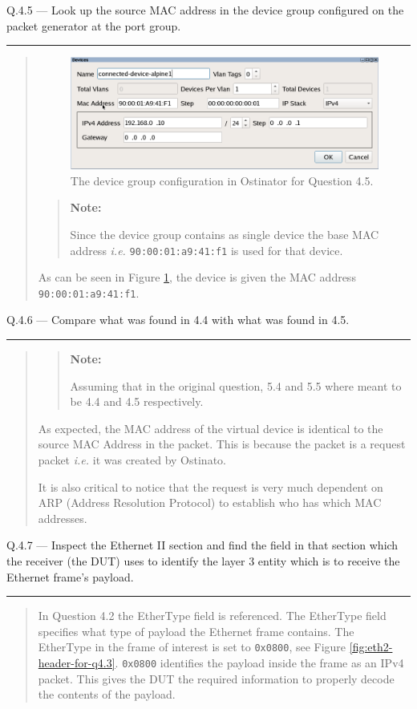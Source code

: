 \documentclass{article}
\newcommand\Que[2]{%
\begin{samepage}
\leavevmode\par
\noindent
Q.#1 --- #2\par\vspace{10pt}\hrule\vspace{10pt}
\end{samepage}}
\newenvironment{ans}
{\fbox{Answer}\begin{quote}\nopagebreak}
{\end{quote}}
\newcommand\ie{\emph{i.e.}}
\newenvironment{note}{%
\begin{quote}
\begin{tcolorbox}[colback=gray!10,arc=0mm,boxrule=0pt]
\raggedright
\textbf{Note:}%
}{%
\end{tcolorbox}
\end{quote}%
}
\begin{document}
\Que{4.5}{Look up the source MAC address in the device group
configured on the packet generator at the port group.}

\begin{ans}
\begin{figure}[H]
\centering
\includegraphics[width=14cm]{data/q4.5-device-group-config.png}
\caption{The device group configuration in Ostinator for
Question 4.5.}
\label{fig:devic-config-q4.5}
\end{figure}
\begin{note}
Since the device group contains as single device the
base MAC address \ie{} \texttt{90:00:01:a9:41:f1} is used for that
device.
\end{note}

As can be seen in Figure \ref{fig:devic-config-q4.5}, the
device is given the MAC address \texttt{90:00:01:a9:41:f1}.
\end{ans}

\Que{4.6}{Compare what was found in 4.4 with what was found in
4.5.}
\begin{ans}
\begin{note}
Assuming that in the original question, 5.4 and 5.5 where
meant to be 4.4 and 4.5 respectively.
\end{note}

As expected, the MAC address of the virtual device is
identical to the source MAC Address in the packet. This is
because the packet is a request packet \ie{} it was created
by Ostinato.

It is also critical to notice that the request is very much
dependent on ARP (Address Resolution Protocol) to establish
who has which MAC addresses.
\end{ans}

\Que{4.7}{Inspect the Ethernet II section and find the field in
that section which the receiver (the DUT) uses to identify the
layer 3 entity which is to receive the Ethernet frame's
payload.}
\begin{ans}
In Question 4.2 the EtherType field is referenced. The
EtherType field specifies what type of payload the
Ethernet frame contains. The EtherType in the frame of
interest is set to \texttt{0x0800}, see Figure
\ref{fig:eth2-header-for-q4.3}. \texttt{0x0800}
identifies the payload inside the frame as an IPv4
packet. This gives the DUT the required information to
properly decode the contents of the payload.
\end{ans}
\end{document}
